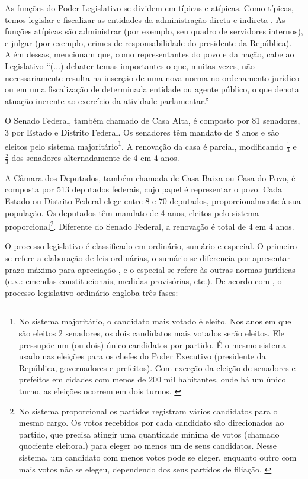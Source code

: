 \documentclass[a4paper,titlepage]{ppgi}\usepackage[]{graphicx}\usepackage[]{color}
\begin{document}
As funções do Poder Legislativo se dividem em típicas e atípicas. Como típicas,
temos legislar \cite[arts. 48, 49, 51 e 52]{CF1988} e fiscalizar as entidades da
administração direta e indireta \cite[art. 70]{CF1988}. As funções atípicas são
administrar (por exemplo, seu quadro de servidores internos), e julgar (por
exemplo, crimes de responsabilidade do presidente da República). Além dessas,
 mencionam que, como representantes do povo e da
nação, cabe ao Legislativo ``(...) debater temas importantes o que, muitas
vezes, não necessariamente resulta na inserção de uma nova norma no ordenamento
jurídico ou em uma fiscalização de determinada entidade ou agente público, o
que denota atuação inerente ao exercício da atividade parlamentar.''

O Senado Federal, também chamado de Casa Alta, é composto por 81 senadores, 3
por Estado e Distrito Federal. Os senadores têm mandato de 8 anos e são eleitos
pelo sistema majoritário\footnote{No sistema majoritário, o candidato mais
votado é eleito. Nos anos em que são eleitos 2 senadores, os dois candidatos
mais votados serão eleitos. Ele pressupõe um (ou dois) único candidatos por
partido. É o mesmo sistema usado nas eleições para os chefes do Poder Executivo
(presidente da República, governadores e prefeitos). Com exceção da eleição de
senadores e prefeitos em cidades com menos de 200 mil habitantes, onde há um
único turno, as eleições ocorrem em dois turnos. \cite{Carneiro2013}}. A
renovação da casa é parcial, modificando $\frac{1}{3}$ e $\frac{2}{3}$ dos
senadores alternadamente de 4 em 4 anos.

A Câmara dos Deputados, também chamada de Casa Baixa ou Casa do Povo, é
composta por 513 deputados federais, cujo papel é representar o povo. Cada
Estado ou Distrito Federal elege entre 8 e 70 deputados, proporcionalmente à
sua população. Os deputados têm mandato de 4 anos, eleitos pelo sistema
proporcional\footnote{No sistema proporcional os partidos registram vários
candidatos para o mesmo cargo. Os votos recebidos por cada candidato são
direcionados ao partido, que precisa atingir uma quantidade mínima de votos
(chamado quociente eleitoral) para eleger ao menos um de seus candidatos. Nesse
sistema, um candidato com menos votos pode se eleger, enquanto outro com mais
votos não se elegeu, dependendo dos seus partidos de filiação.
\cite{Carneiro2013,Bramatti2014}}. Diferente do Senado Federal, a renovação é
total de 4 em 4 anos.

O processo legislativo é classificado em ordinário, sumário e especial. O
primeiro se refere a elaboração de leis ordinárias, o sumário se diferencia por
apresentar prazo máximo para apreciação \cite[art. 64]{CF1988}, e o especial se
refere às outras normas jurídicas (e.x.: emendas constitucionais, medidas
provisórias, etc.). De acordo com , o processo
legislativo ordinário engloba três fases: 
\end{document}
